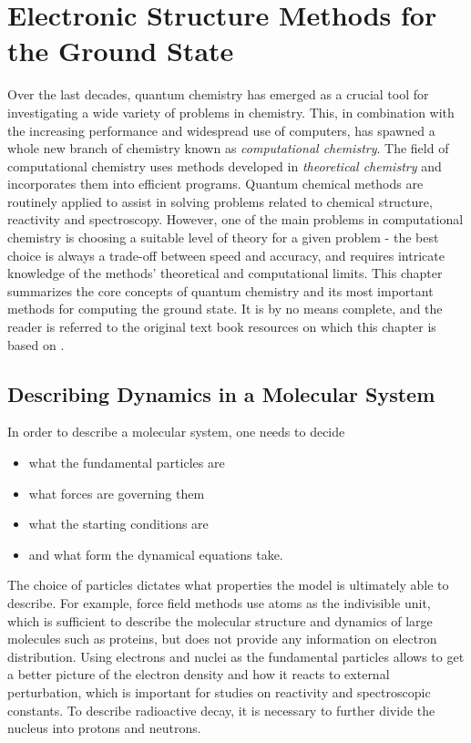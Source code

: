 \chapter{Electronic Structure Methods for the Ground State}

Over the last decades, quantum chemistry has emerged as a crucial tool for investigating a wide variety of problems in chemistry. This, in combination with the increasing performance and widespread use of computers, has spawned a whole new branch of chemistry known as \emph{computational chemistry}. The field of computational chemistry uses methods developed in \emph{theoretical chemistry} and incorporates them into efficient programs. Quantum chemical methods are routinely applied to assist in solving problems related to chemical structure, reactivity and spectroscopy. However, one of the main problems in computational chemistry is choosing a suitable level of theory for a given problem - the best choice is always a trade-off between speed and accuracy, and requires intricate knowledge of the methods' theoretical and computational limits. This chapter summarizes the core concepts of quantum chemistry and its most important methods for computing the ground state. It is by no means complete, and the reader is referred to the original text book resources on which this chapter is based on \cite{Sza1996,Hel2000,Jen2017,Nor2018,Sch2018}.

\section{Describing Dynamics in a Molecular System}

In order to describe a molecular system, one needs to decide
\begin{itemize}
\item what the fundamental particles are
\item what forces are governing them
\item what the starting conditions are
\item and what form the dynamical equations take.
\end{itemize}
\noindent The choice of particles dictates what properties the model is ultimately able to describe. For example, force field methods use atoms as the indivisible unit, which is sufficient to describe the molecular structure and dynamics of large molecules such as proteins, but does not provide any information on electron distribution. Using electrons and nuclei as the fundamental particles allows to get a better picture of the electron density and how it reacts to external perturbation, which is important for studies on reactivity and spectroscopic constants. To describe radioactive decay, it is necessary to further divide the nucleus into protons and neutrons. 

